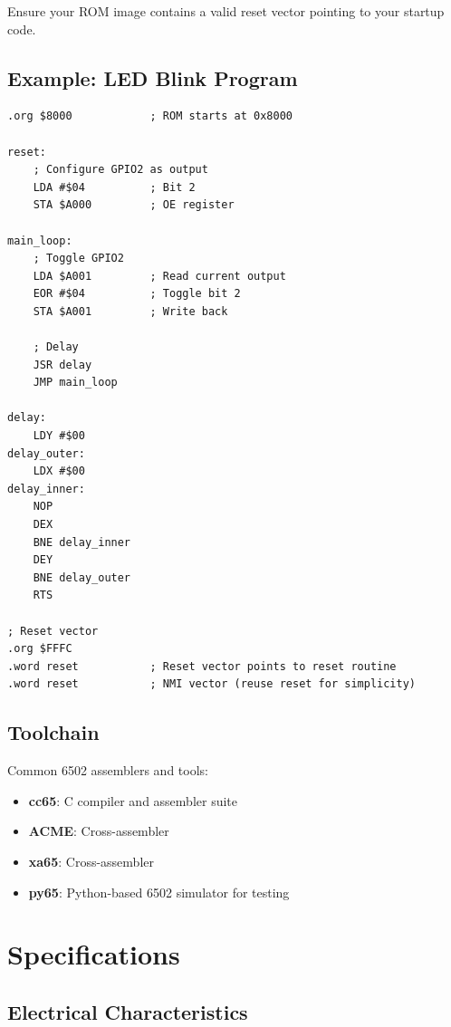 \documentclass[11pt,a4paper]{article}
\begin{document}
Ensure your ROM image contains a valid reset vector pointing to your startup code.

\subsection{Example: LED Blink Program}

\begin{lstlisting}[language=asm6502, caption=Simple LED blink on GPIO2]
.org $8000            ; ROM starts at 0x8000

reset:
    ; Configure GPIO2 as output
    LDA #$04          ; Bit 2
    STA $A000         ; OE register

main_loop:
    ; Toggle GPIO2
    LDA $A001         ; Read current output
    EOR #$04          ; Toggle bit 2
    STA $A001         ; Write back

    ; Delay
    JSR delay
    JMP main_loop

delay:
    LDY #$00
delay_outer:
    LDX #$00
delay_inner:
    NOP
    DEX
    BNE delay_inner
    DEY
    BNE delay_outer
    RTS

; Reset vector
.org $FFFC
.word reset           ; Reset vector points to reset routine
.word reset           ; NMI vector (reuse reset for simplicity)
\end{lstlisting}

\subsection{Toolchain}

Common 6502 assemblers and tools:
\begin{itemize}
    \item \textbf{cc65}: C compiler and assembler suite
    \item \textbf{ACME}: Cross-assembler
    \item \textbf{xa65}: Cross-assembler
    \item \textbf{py65}: Python-based 6502 simulator for testing
\end{itemize}

\section{Specifications}

\subsection{Electrical Characteristics}
\end{document}
